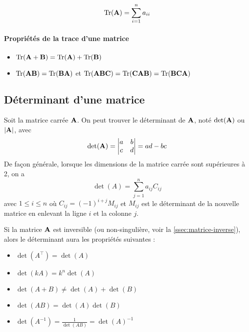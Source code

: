 \begin{equation}
\label{eq:trace-mat}
\operatorname{Tr}(\mathbf{A}) = \sum_{i=1}^n a_{ii}
\end{equation} 
\paragraph{Propriétés de la trace d'une matrice}
\begin{itemize}
\item $\operatorname{Tr}(\mathbf{A+B}) = \operatorname{Tr}(\mathbf{A}) + \operatorname{Tr}(\mathbf{B})$
\item $\operatorname{Tr}(\mathbf{AB}) = \operatorname{Tr}(\mathbf{BA})$ et $\operatorname{Tr}(\mathbf{ABC}) = \operatorname{Tr}(\mathbf{CAB}) = \operatorname{Tr}(\mathbf{BCA})$
\end{itemize}

\subsection{Déterminant d'une matrice}
\label{ssec:det-matrice}
Soit la matrice carrée $\mathbf{A}$. On peut trouver le déterminant de $\mathbf{A}$, noté $\det(\mathbf{A})$ ou $|\mathbf{A}|$, avec
\begin{equation}
\det(\mathbf{A}) =
\begin{vmatrix}
a & b \\
c & d \\
\end{vmatrix} = ad - bc
\end{equation}
De façon générale, lorsque les dimensions de la matrice carrée sont supérieures à 2, on a
\begin{equation}
\label{eq:det-matrice}
\det(A) = \sum_{j=1}^n a_{ij} C_{ij}
\end{equation}
avec $1 \le i \le n$ où $C_{ij}  = (-1)^{i+j} M_{ij}$ et $M_{ij}$ est le déterminant de la nouvelle matrice en enlevant la ligne $i$ et la colonne $j$.

Si la matrice $\mathbf{A}$ est inversible (ou non-singulière, voir la \autoref{ssec:matrice-inverse}), alors le déterminant aura les propriétés suivantes : 
\begin{itemize}
\item $\det(A^\top)  = \det(A)$
\item $\det(kA)   = k^n \det(A)$
\item $\det(A + B)  \neq \det(A) + \det(B)$
\item $\det(AB)   = \det(A) \det(B)$
\item $\det(A^{-1})  = \frac{1}{\det(AB)} = \det(A)^{-1}$
\end{itemize}

